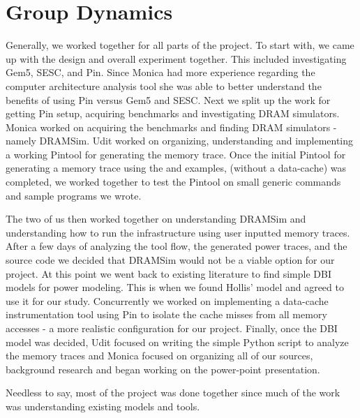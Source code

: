 \section{Group Dynamics}
\label{sec-group-dynamics}

Generally, we worked together for all parts of the project. To start with, we
came up with the design and overall experiment together. This included
investigating Gem5, SESC, and Pin. Since Monica had more experience regarding
the computer architecture analysis tool she was able to better understand the
benefits of using Pin versus Gem5 and SESC. Next we split up the work for
getting Pin setup, acquiring benchmarks and investigating DRAM simulators.
Monica worked on acquiring the benchmarks and finding DRAM simulators - namely
DRAMSim. Udit worked on organizing, understanding and implementing a working
Pintool for generating the memory trace. Once the initial Pintool for
generating a memory trace using the  and  examples,
(without a data-cache) was completed, we worked together to test the Pintool on
small generic  commands and sample programs we wrote.

The two of us then worked together on understanding DRAMSim and understanding
how to run the infrastructure using user inputted memory traces. After a few
days of analyzing the tool flow, the generated power traces, and the source
code we decided that DRAMSim would not be a viable option for our
project. At this point we went back to existing literature to find simple DBI
models for power modeling. This is when we found Hollis' model \cite{hollis}
and agreed to use it for our study. Concurrently we worked on implementing a
data-cache instrumentation tool using Pin to isolate the cache misses from all
memory accesses - a more realistic configuration for our project. Finally, once
the DBI model was decided, Udit focused on writing the simple Python script to
analyze the memory traces and Monica focused on organizing all of our sources,
background research and began working on the power-point presentation.

Needless to say, most of the project was done together since much of the work
was understanding existing models and tools.
